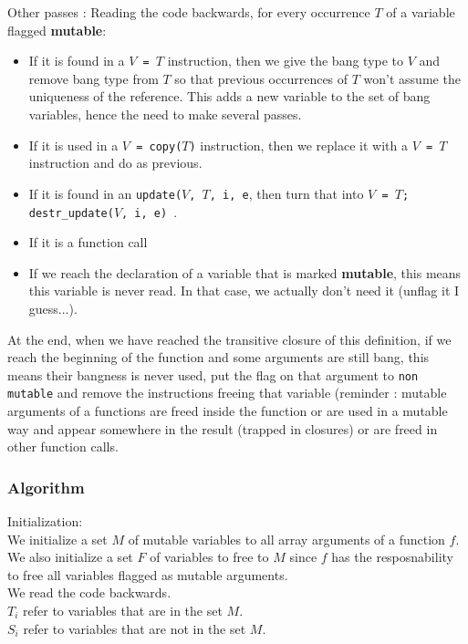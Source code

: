 \documentclass[12pt,a4paper,titlepage]{article}
\newcommand{\cl}[1]{\texttt{#1}}
\begin{document}
Other passes :
Reading the code backwards, for every occurrence $T$ of a variable flagged \textbf{mutable}:
\begin{itemize}
\item If it is found in a \cl{$V$ = $T$} instruction, then we give the bang type to $V$ and remove bang type from $T$ so that previous occurrences of $T$ won't assume the uniqueness of the reference. This adds a new variable to the set of bang variables, hence the need to make several passes.
\item If it is used in a \cl{$V$ = copy($T$)} instruction, then we replace it with a \cl{$V$ = $T$} instruction and do as previous.
\item If it is found in an \cl{update($V$, $T$, i, e}, then turn that into \cl{$V$ = $T$; destr\_update($V$, i, e) }.
\item If it is a function call 
\item If we reach the declaration of a variable that is marked \textbf{mutable}, this means this variable is never read. In that case, we actually don't need it (unflag it I guess...).
\end{itemize}

At the end, when we have reached the transitive closure of this definition, if we reach the beginning of the function and some arguments are still bang, this means their bangness is never used, put the flag on that argument to \cl{non mutable} and remove the instructions freeing that variable (reminder : mutable arguments of a functions are freed inside the function or are used in a mutable way and appear somewhere in the result (trapped in closures) or are freed in other function calls.

\subsubsection{Algorithm}

Initialization:\\
We initialize a set $M$ of mutable variables to all array arguments of a function $f$.
We also initialize a set $F$ of variables to free to $M$ since $f$ has the resposnability to free all variables flagged as mutable arguments.\\

We read the code backwards.\\
$T_i$ refer to variables that are in the set $M$.\\
$S_i$ refer to variables that are not in the set $M$.
\end{document}
